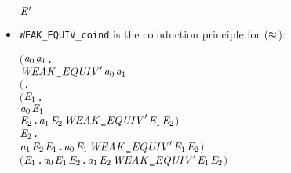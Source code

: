 \begin{itemize}
\begin{alltt}
    \HOLSymConst{\HOLTokenWeakEQ} \ensuremath{\HOLFreeVar{E}\sp{\prime}}
\end{alltt}
\item \texttt{WEAK_EQUIV_coind} is the coinduction principle for  ($\approx$):
\begin{alltt}
\HOLTokenTurnstile{} \ensuremath{(}\HOLSymConst{\HOLTokenForall{}}\ensuremath{\HOLBoundVar{a}\sb{\mathrm{0}}} \ensuremath{\HOLBoundVar{a}\sb{\mathrm{1}}}.
        \ensuremath{\HOLFreeVar{WEAK\HOLTokenUnderscore{}EQUIV}\sp{\prime}} \ensuremath{\HOLBoundVar{a}\sb{\mathrm{0}}} \ensuremath{\HOLBoundVar{a}\sb{\mathrm{1}}} \HOLSymConst{\HOLTokenImp{}}
        \ensuremath{(}\HOLSymConst{\HOLTokenForall{}}.
             \ensuremath{(}\HOLSymConst{\HOLTokenForall{}}\ensuremath{\HOLBoundVar{E}\sb{\mathrm{1}}}.
                  \ensuremath{\HOLBoundVar{a}\sb{\mathrm{0}}} \HOLTokenTransBegin{} \HOLTokenTransEnd \ensuremath{\HOLBoundVar{E}\sb{\mathrm{1}}} \HOLSymConst{\HOLTokenImp{}}
                  \HOLSymConst{\HOLTokenExists{}}\ensuremath{\HOLBoundVar{E}\sb{\mathrm{2}}}. \ensuremath{\HOLBoundVar{a}\sb{\mathrm{1}}} \HOLTokenWeakTransBegin{} \HOLTokenWeakTransEnd \ensuremath{\HOLBoundVar{E}\sb{\mathrm{2}}} \HOLSymConst{\HOLTokenConj{}} \ensuremath{\HOLFreeVar{WEAK\HOLTokenUnderscore{}EQUIV}\sp{\prime}} \ensuremath{\HOLBoundVar{E}\sb{\mathrm{1}}} \ensuremath{\HOLBoundVar{E}\sb{\mathrm{2}}}\ensuremath{)} \HOLSymConst{\HOLTokenConj{}}
             \HOLSymConst{\HOLTokenForall{}}\ensuremath{\HOLBoundVar{E}\sb{\mathrm{2}}}.
                 \ensuremath{\HOLBoundVar{a}\sb{\mathrm{1}}} \HOLTokenTransBegin{} \HOLTokenTransEnd \ensuremath{\HOLBoundVar{E}\sb{\mathrm{2}}} \HOLSymConst{\HOLTokenImp{}} \HOLSymConst{\HOLTokenExists{}}\ensuremath{\HOLBoundVar{E}\sb{\mathrm{1}}}. \ensuremath{\HOLBoundVar{a}\sb{\mathrm{0}}} \HOLTokenWeakTransBegin{} \HOLTokenWeakTransEnd \ensuremath{\HOLBoundVar{E}\sb{\mathrm{1}}} \HOLSymConst{\HOLTokenConj{}} \ensuremath{\HOLFreeVar{WEAK\HOLTokenUnderscore{}EQUIV}\sp{\prime}} \ensuremath{\HOLBoundVar{E}\sb{\mathrm{1}}} \ensuremath{\HOLBoundVar{E}\sb{\mathrm{2}}}\ensuremath{)} \HOLSymConst{\HOLTokenConj{}}
        \ensuremath{(}\HOLSymConst{\HOLTokenForall{}}\ensuremath{\HOLBoundVar{E}\sb{\mathrm{1}}}. \ensuremath{\HOLBoundVar{a}\sb{\mathrm{0}}} \HOLTokenTransBegin\HOLSymConst{\ensuremath{\tau}}\HOLTokenTransEnd \ensuremath{\HOLBoundVar{E}\sb{\mathrm{1}}} \HOLSymConst{\HOLTokenImp{}} \HOLSymConst{\HOLTokenExists{}}\ensuremath{\HOLBoundVar{E}\sb{\mathrm{2}}}. \ensuremath{\HOLBoundVar{a}\sb{\mathrm{1}}} \HOLSymConst{\HOLTokenEPS} \ensuremath{\HOLBoundVar{E}\sb{\mathrm{2}}} \HOLSymConst{\HOLTokenConj{}} \ensuremath{\HOLFreeVar{WEAK\HOLTokenUnderscore{}EQUIV}\sp{\prime}} \ensuremath{\HOLBoundVar{E}\sb{\mathrm{1}}} \ensuremath{\HOLBoundVar{E}\sb{\mathrm{2}}}\ensuremath{)} \HOLSymConst{\HOLTokenConj{}}

\end{alltt}
\end{itemize}
